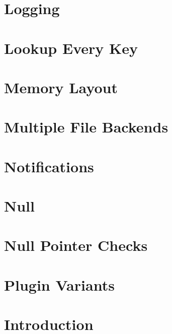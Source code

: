 \let\mypdfximage\pdfximage\def\pdfximage{\immediate\mypdfximage}\documentclass[twoside]{book}
\newcommand{\+}{\discretionary{\mbox{\scriptsize$\hookleftarrow$}}{}{}}
\begin{document}
\chapter{Logging}
\label{doc_decisions_logging_md}

\chapter{Lookup Every Key}
\label{doc_decisions_lookup_every_key_md}

\chapter{Memory Layout}
\label{doc_decisions_memory_layout_md}

\chapter{Multiple File Backends}
\label{doc_decisions_multiple_file_backends_md}

\chapter{Notifications}
\label{doc_decisions_notifications_md}

\chapter{Null}
\label{doc_decisions_null_md}

\chapter{Null Pointer Checks}
\label{doc_decisions_null_pointer_checks_md}

\chapter{Plugin Variants}
\label{doc_decisions_plugin_variants_md}

\chapter{Introduction}
\label{doc_decisions_README_md}

\end{document}
